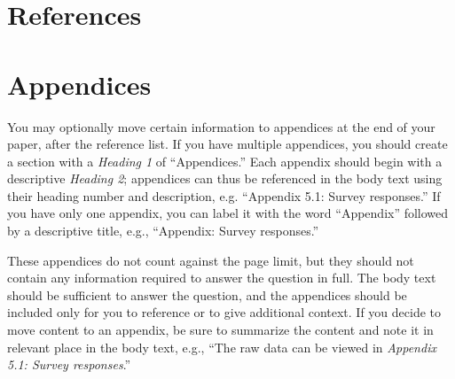 \documentclass[
	letterpaper, %
]{jdf}
\begin{document}
\section{References}
\printbibliography[heading=none]

\section{Appendices}
You may optionally move certain information to appendices at the end of your paper, after the reference list. If you have multiple appendices, you should create a section with a \emph{Heading 1} of “Appendices.” Each appendix should begin with a descriptive \emph{Heading 2}; appendices can thus be referenced in the body text using their heading number and description, e.g. “Appendix 5.1: Survey responses.” If you have only one appendix, you can label it with the word “Appendix” followed by a descriptive title, e.g., “Appendix: Survey responses.”

These appendices do not count against the page limit, but they should not contain any information required to answer the question in full. The body text should be sufficient to answer the question, and the appendices should be included only for you to reference or to give additional context. If you decide to move content to an appendix, be sure to summarize the content and note it in relevant place in the body text, e.g., “The raw data can be viewed in \emph{Appendix 5.1: Survey responses}.”
\end{document}
